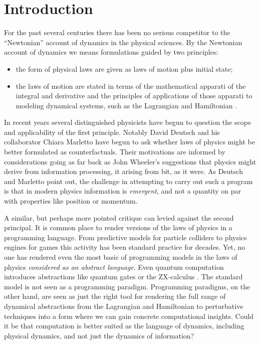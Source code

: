 \section{Introduction}\label{sec:introduction} %
For the past several centuries there has been no serious competitor to
the ``Newtonian'' account of dynamics in the physical sciences. By the
Newtonian account of dynamics we means formulations guided by two principles:
\begin{itemize}
  \item the form of physical laws are given as laws of motion plus initial state;
  \item the laws of motion are stated in terms of the mathematical
    apparati of the integral and derivative and the principles of
    applications of those apparati to modeling dynamical systems, such
    as the Lagrangian and Hamiltonian \cite{DBLP:books/daglib/0015653}.
\end{itemize}
In recent years several distinguished physicists have begun to
question the scope and applicability of the first principle. Notably
David Deutsch \cite{DBLP:journals/synthese/Deutsch13} and his collaborator Chiara Marletto \cite{RS:journals//Marletto2015} have begun to ask
whether laws of physics might be better formulated as
counterfactuals. Their motivations are informed by considerations
going as far back as John Wheeler's suggestions that physics might
derive from information processing, it arising from bit, as it
were. As Deutsch and Marletto point out, the challenge in attempting
to carry out such a program is that in modern physics information is
\emph{emergent}, and not a quantity on par with properties like
position or momentum.

A similar, but perhaps more pointed critique can levied against the
second principal. It is common place to render versions of the laws of
physics in a programming language. From predictive models for particle
colliders to physics engines for games this activity has been standard
practice for decades. Yet, no one has rendered even the most basic of
programming models in the laws of physics \emph{considered as an
  abstract language}. Even quantum computation introduces abstractions
like quantum gates or the ZX-calculus \cite{https://doi.org/10.48550/arxiv.2012.13966}. The standard model is not seen
as a programming paradigm. Programming paradigms, on the other hand,
are seen as just the right tool for rendering the full range of
dynamical abstractions from the Lagrangian and Hamiltonian to
perturbative techniques into a form where we can gain concrete
computational insights. Could it be that computation is better suited
as the language of dynamics, including physical dynamics, and not just
the dynamics of information?

